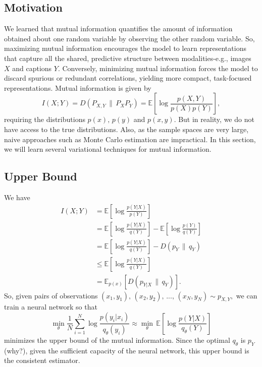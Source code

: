 \subsection{Motivation}
We learned that mutual information quantifies the amount of information obtained about one random variable by observing the other random variable.
So, maximizing mutual information encourages the model to learn representations that capture all the shared, predictive structure between modalities-e.g., images $X$ and captions $Y$. Conversely, minimizing mutual information forces the model to discard spurious or redundant correlations, yielding more compact, task-focused representations. Mutual information is given by 
\[I(X;Y)=D(P_{X,Y}\,\|\,P_XP_Y)=\mathbb{E}\left[\log\frac{p(X,Y)}{p(X)p(Y)}\right],\] requiring the distributions $p(x),\,p(y)$ and $p(x,y)$. But in reality, we do not have access to the true distributions. Also, as the sample spaces are very large, naive approaches such as Monte Carlo estimation are impractical. In this section, we will learn several variational techniques for mutual information.
\subsection{Upper Bound}
We have \[
\begin{aligned}
    I(X;Y)&=\mathbb{E}\left[\log\frac{p(Y|X)}{p(Y)}\right]\\&=\mathbb{E}\left[\log\frac{p(Y|X)}{q(Y)}\right]-\mathbb{E}\left[\log\frac{p(Y)}{q(Y)}\right]\\&=\mathbb{E}\left[\log\frac{p(Y|X)}{q(Y)}\right]-D(p_Y\,\|\,q_Y)\\&\leq \mathbb{E}\left[\log\frac{p(Y|X)}{q(Y)}\right]\\&=\mathbb{E}_{p(x)}\left[D(p_{Y|X}\,\|\,q_Y)\right].
\end{aligned}
\]
So, given pairs of observations $(x_1,y_1),\,(x_2,y_2),\,...,\,(x_N,y_N)\sim p_{X,Y},$ we can train a neural network so that 
\[
\underset{\theta}{\min}\frac{1}{N}\sum_{i=1}^N \log\frac{p(y_i|x_i)}{q_{\theta}(y_i)}\approx\underset{\theta}{\min}\,\mathbb{E}\left[\log\frac{p(Y|X)}{q_{\theta}(Y)}\right]
\]
minimizes the upper bound of the mutual information. Since the optimal $q_{\theta}$ is $p_Y$(why?), given the sufficient capacity of the neural network, this upper bound is the consistent estimator.

